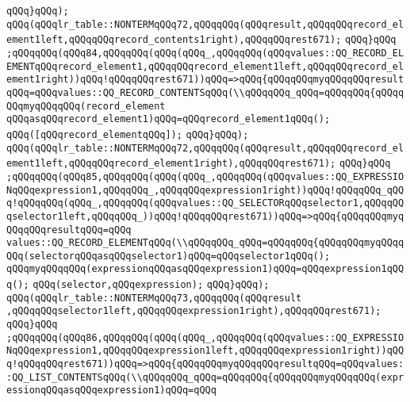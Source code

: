 \verb|qQQq}qQQq);|\newline
\verb|qQQq(qQQqlr_table::NONTERMqQQq72,qQQqqQQq(qQQqresult,qQQqqQQqrecord_element1left,qQQqqQQqrecord_contents1right),qQQqqQQqrest671);|\newline
\verb|qQQq}qQQq|\newline
\verb|;qQQqqQQq(qQQq84,qQQqqQQq(qQQq(qQQq_,qQQqqQQq(qQQqvalues::QQ_RECORD_ELEMENTqQQqrecord_element1,qQQqqQQqrecord_element1left,qQQqqQQqrecord_element1right))qQQq!qQQqqQQqrest671))qQQq=>qQQq{qQQqqQQqmyqQQqqQQqresultqQQq=qQQqvalues::QQ_RECORD_CONTENTSqQQq(\\qQQqqQQq_qQQq=qQQqqQQq{qQQqqQQqmyqQQqqQQq(record_element|\newline
\verb|qQQqasqQQqrecord_element1)qQQq=qQQqrecord_element1qQQq();|\newline
\verb|qQQq([qQQqrecord_elementqQQq]);|\newline
\verb|qQQq}qQQq);|\newline
\verb|qQQq(qQQqlr_table::NONTERMqQQq72,qQQqqQQq(qQQqresult,qQQqqQQqrecord_element1left,qQQqqQQqrecord_element1right),qQQqqQQqrest671);|\newline
\verb|qQQq}qQQq|\newline
\verb|;qQQqqQQq(qQQq85,qQQqqQQq(qQQq(qQQq_,qQQqqQQq(qQQqvalues::QQ_EXPRESSIONqQQqexpression1,qQQqqQQq_,qQQqqQQqexpression1right))qQQq!qQQqqQQq_qQQq!qQQqqQQq(qQQq_,qQQqqQQq(qQQqvalues::QQ_SELECTORqQQqselector1,qQQqqQQqselector1left,qQQqqQQq_))qQQq!qQQqqQQqrest671))qQQq=>qQQq{qQQqqQQqmyqQQqqQQqresultqQQq=qQQq|\newline
\verb|values::QQ_RECORD_ELEMENTqQQq(\\qQQqqQQq_qQQq=qQQqqQQq{qQQqqQQqmyqQQqqQQq(selectorqQQqasqQQqselector1)qQQq=qQQqselector1qQQq();|\newline
\verb|qQQqmyqQQqqQQq(expressionqQQqasqQQqexpression1)qQQq=qQQqexpression1qQQq();|\newline
\verb|qQQq(selector,qQQqexpression);|\newline
\verb|qQQq}qQQq);|\newline
\verb|qQQq(qQQqlr_table::NONTERMqQQq73,qQQqqQQq(qQQqresult|\newline
\verb|,qQQqqQQqselector1left,qQQqqQQqexpression1right),qQQqqQQqrest671);|\newline
\verb|qQQq}qQQq|\newline
\verb|;qQQqqQQq(qQQq86,qQQqqQQq(qQQq(qQQq_,qQQqqQQq(qQQqvalues::QQ_EXPRESSIONqQQqexpression1,qQQqqQQqexpression1left,qQQqqQQqexpression1right))qQQq!qQQqqQQqrest671))qQQq=>qQQq{qQQqqQQqmyqQQqqQQqresultqQQq=qQQqvalues::QQ_LIST_CONTENTSqQQq(\\qQQqqQQq_qQQq=qQQqqQQq{qQQqqQQqmyqQQqqQQq(expressionqQQqasqQQqexpression1)qQQq=qQQq|\newline
